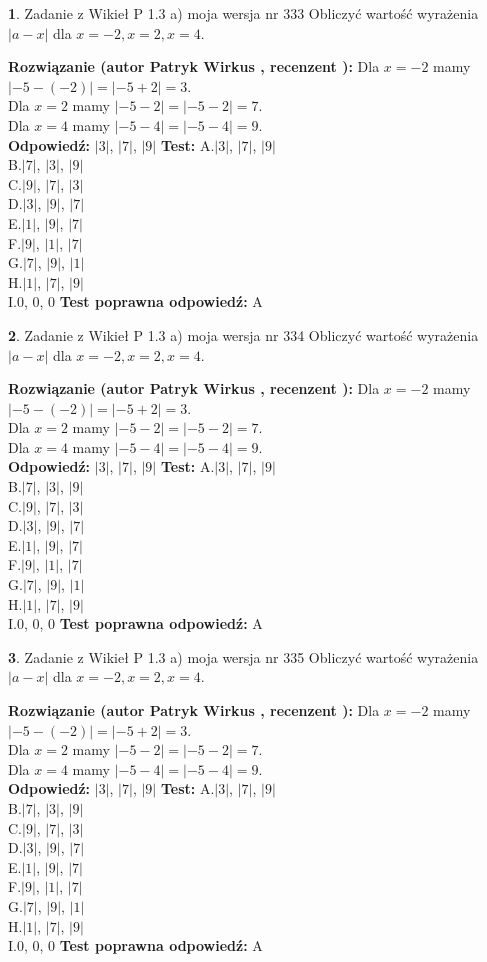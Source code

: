 \documentclass[12pt, a4paper]{article}
\theoremstyle{definition} %
\newtheorem{zad}{}
\newcommand{\zadStart}[1]{\begin{zad}#1\newline}
\newcommand{\zadStop}{\end{zad}}
\newcommand{\rozwStart}[2]{\noindent \textbf{Rozwiązanie (autor #1 , recenzent #2): }\newline}
\newcommand{\rozwStop}{\newline}
\newcommand{\odpStart}{\noindent \textbf{Odpowiedź:}\newline}
\newcommand{\odpStop}{\newline}
\newcommand{\testStart}{\noindent \textbf{Test:}\newline}
\newcommand{\testStop}{\newline}
\newcommand{\kluczStart}{\noindent \textbf{Test poprawna odpowiedź:}\newline}
\newcommand{\kluczStop}{\newline}
\begin{document}
\zadStart{Zadanie z Wikieł P 1.3 a) moja wersja nr 333}
Obliczyć wartość wyrażenia $|a - x|$ dla $x=-2,x=2,x=4$.
\zadStop
\rozwStart{Patryk Wirkus}{}
Dla $x = -2$ mamy $|-5 - (-2)| = |-5 + 2| = 3$.\\
Dla $x = 2$ mamy $|-5 - 2| = |-5 - 2| = 7$.\\
Dla $x = 4$ mamy $|-5 - 4| = |-5 - 4| = 9$.\\
\rozwStop
\odpStart
$|3|$, $|7|$, $|9|$
\odpStop
\testStart
A.$|3|$, $|7|$, $|9|$\\
B.$|7|$, $|3|$, $|9|$\\
C.$|9|$, $|7|$, $|3|$\\
D.$|3|$, $|9|$, $|7|$\\
E.$|1|$, $|9|$, $|7|$\\
F.$|9|$, $|1|$, $|7|$\\
G.$|7|$, $|9|$, $|1|$\\
H.$|1|$, $|7|$, $|9|$\\
I.$0$, $0$, $0$
\testStop
\kluczStart
A
\kluczStop



\zadStart{Zadanie z Wikieł P 1.3 a) moja wersja nr 334}
Obliczyć wartość wyrażenia $|a - x|$ dla $x=-2,x=2,x=4$.
\zadStop
\rozwStart{Patryk Wirkus}{}
Dla $x = -2$ mamy $|-5 - (-2)| = |-5 + 2| = 3$.\\
Dla $x = 2$ mamy $|-5 - 2| = |-5 - 2| = 7$.\\
Dla $x = 4$ mamy $|-5 - 4| = |-5 - 4| = 9$.\\
\rozwStop
\odpStart
$|3|$, $|7|$, $|9|$
\odpStop
\testStart
A.$|3|$, $|7|$, $|9|$\\
B.$|7|$, $|3|$, $|9|$\\
C.$|9|$, $|7|$, $|3|$\\
D.$|3|$, $|9|$, $|7|$\\
E.$|1|$, $|9|$, $|7|$\\
F.$|9|$, $|1|$, $|7|$\\
G.$|7|$, $|9|$, $|1|$\\
H.$|1|$, $|7|$, $|9|$\\
I.$0$, $0$, $0$
\testStop
\kluczStart
A
\kluczStop



\zadStart{Zadanie z Wikieł P 1.3 a) moja wersja nr 335}
Obliczyć wartość wyrażenia $|a - x|$ dla $x=-2,x=2,x=4$.
\zadStop
\rozwStart{Patryk Wirkus}{}
Dla $x = -2$ mamy $|-5 - (-2)| = |-5 + 2| = 3$.\\
Dla $x = 2$ mamy $|-5 - 2| = |-5 - 2| = 7$.\\
Dla $x = 4$ mamy $|-5 - 4| = |-5 - 4| = 9$.\\
\rozwStop
\odpStart
$|3|$, $|7|$, $|9|$
\odpStop
\testStart
A.$|3|$, $|7|$, $|9|$\\
B.$|7|$, $|3|$, $|9|$\\
C.$|9|$, $|7|$, $|3|$\\
D.$|3|$, $|9|$, $|7|$\\
E.$|1|$, $|9|$, $|7|$\\
F.$|9|$, $|1|$, $|7|$\\
G.$|7|$, $|9|$, $|1|$\\
H.$|1|$, $|7|$, $|9|$\\
I.$0$, $0$, $0$
\testStop
\kluczStart
A
\kluczStop
\end{document}
